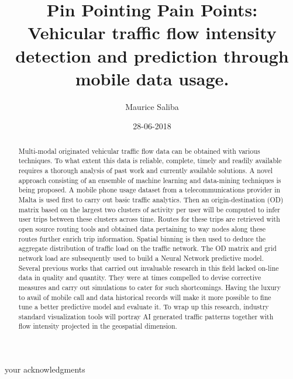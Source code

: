 \documentclass[12pt, a4paper]{report}
\theoremstyle{definition}
\theoremstyle{definition}%
\theoremstyle{definition}%
\theoremstyle{definition}%
\theoremstyle{definition}%
\theoremstyle{definition}%
\begin{document}
\title{Pin Pointing Pain Points: Vehicular traffic flow intensity detection and prediction through mobile data usage.}
\author{Maurice Saliba}
\date{28-06-2018}

\frontmatter


\begin{acknowledgements}
your acknowledgments
\end{acknowledgements}
       
\begin{abstract}
Multi-modal originated vehicular traffic flow data can be obtained with various techniques. To what extent this data is reliable, complete, timely and readily available requires a thorough analysis of past work and currently available solutions. A novel approach consisting of an ensemble of machine learning and data-mining techniques is being proposed. 
A mobile phone usage dataset from a telecommunications provider in Malta is used first to carry out basic traffic analytics. Then an origin-destination (OD) matrix based on the largest two clusters of activity per user will be computed to infer user trips between these clusters across time. Routes for these trips are retrieved with open source routing tools and obtained data pertaining to way nodes along these routes further enrich trip information. Spatial binning is then used to deduce the aggregate distribution of traffic load on the traffic network.  The OD matrix and grid network load are subsequently used to build a Neural Network predictive model. Several previous works \cite{Laurila2012,Hoteit2014} that carried out invaluable research in this field lacked on-line data in quality and quantity. They were at times compelled to devise corrective measures and carry out simulations to cater for such shortcomings. Having the luxury to avail of mobile call and data historical records will make it more possible to fine tune a better predictive model and evaluate it. To wrap up this research, industry standard visualization tools will portray AI generated traffic patterns together with flow intensity projected in the geospatial dimension. 
\end{abstract}

\tableofcontents

\listoffigures

\listoftables



\mainmatter
\end{document}

